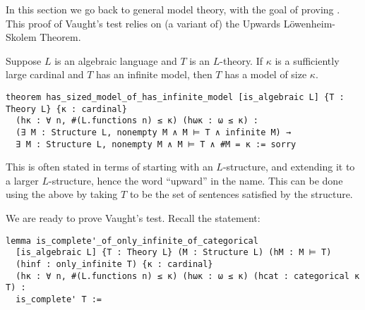 
In this section we go back to general model theory,
with the goal of proving .
This proof of Vaught's test relies on (a variant of) the
Upwards L\"{o}wenheim-Skolem Theorem.

\begin{prop}
  Suppose $L$ is an algebraic language and $T$ is an $L$-theory.
  If $\kappa$ is a sufficiently large cardinal and $T$ has an infinite model,
  then $T$ has a model of size $\kappa$.

  \begin{lstlisting}
theorem has_sized_model_of_has_infinite_model [is_algebraic L] {T : Theory L} {κ : cardinal}
  (hκ : ∀ n, #(L.functions n) ≤ κ) (hωκ : ω ≤ κ) :
  (∃ M : Structure L, nonempty M ∧ M ⊨ T ∧ infinite M) →
  ∃ M : Structure L, nonempty M ∧ M ⊨ T ∧ #M = κ := sorry \end{lstlisting}
\end{prop}

This is often stated in terms of starting with an $L$-structure,
and extending it to a larger $L$-structure,
hence the word ``upward'' in the name.
This can be done using the above by taking $T$ to be the set of
sentences satisfied by the structure.

We are ready to prove Vaught's test.
Recall the statement:

\begin{lstlisting}
lemma is_complete'_of_only_infinite_of_categorical
  [is_algebraic L] {T : Theory L} (M : Structure L) (hM : M ⊨ T)
  (hinf : only_infinite T) {κ : cardinal}
  (hκ : ∀ n, #(L.functions n) ≤ κ) (hωκ : ω ≤ κ) (hcat : categorical κ T) :
  is_complete' T := \end{lstlisting}

